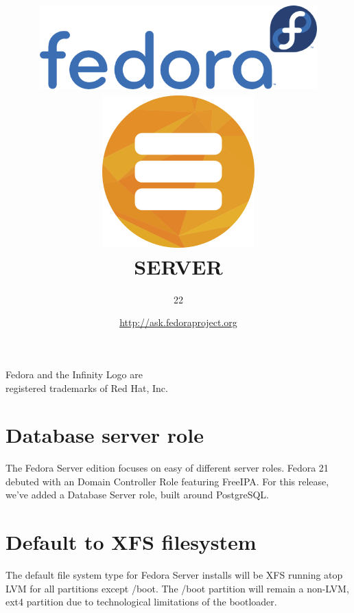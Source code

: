 \documentclass[
notumble,
letterpaper,
10pt
]{leaflet}
\title{\includegraphics[keepaspectratio,width=0.8\textwidth]{Logo_fedoralogo.png}\vspace{1cm}\\\includegraphics[keepaspectratio,scale=0.5]{logo-color-server.png}\\\vspace{0.5cm}\LARGE{\textcolor{ResolutionBlue}{SERVER}}}
\author{\LARGE{\textcolor{ResolutionBlue}{22}}}
\date{\href{http://ask.fedoraproject.org}{http://ask.fedoraproject.org}}
\begin{document}
\maketitle
\thispagestyle{empty}
\vspace{5cm}
\begin{center}\small{Fedora and the Infinity Logo are\\registered trademarks of Red Hat, Inc.}\end{center}

\newpage

\section{\textcolor{FedoraBlue}{Database server role}}
The Fedora Server edition focuses on easy of different server roles. Fedora 21 debuted with an Domain Controller Role featuring FreeIPA. For this release, we've added a Database Server role, built around PostgreSQL. 

\section{\textcolor{FedoraBlue}{Default to XFS filesystem}}
The default file system type for Fedora Server installs will be XFS running atop LVM for all partitions except /boot. The /boot partition will remain a non-LVM, ext4 partition due to technological limitations of the bootloader. 
\end{document}
